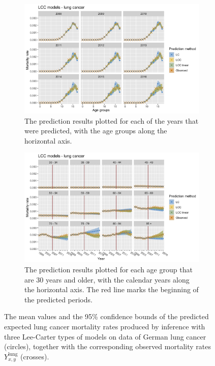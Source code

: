 \begin{figure}[h!]
    \centering
    \begin{subfigure}[b]{.75\linewidth}
        \includegraphics[width=\linewidth]{real-data/real-data-univariate/Figures/univariate-LCC-by-age-lung.png}
        \caption{The prediction results plotted for each of the years that were predicted, with the age groups along the horizontal axis.}
        \label{fig:uv-LCC-lung-top}
    \end{subfigure}
    
    \begin{subfigure}[b]{.75\linewidth}
        \includegraphics[width=\linewidth]{real-data/real-data-univariate/Figures/univariate-LCC-by-period-lung.png}
        \caption{The prediction results plotted for each age group that are 30 years and older, with the calendar years along the horizontal axis. The red line marks the beginning of the predicted periods. }
        \label{fig:uv-LCC-lung-bottom}
    \end{subfigure}
    \caption{The mean values and the 95\% confidence bounds of the predicted expected lung cancer mortality rates produced by inference with three Lee-Carter types of models on data of German lung cancer (circles), together with the corresponding observed mortality rates $Y_{x,y}^{\text{lung}}$ (crosses).
    }
    \label{fig:uv-LCC-lung}
\end{figure}

